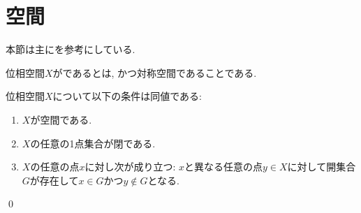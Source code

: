 \documentclass[uplatex, dvipdfmx, a4paper, 12pt, class=jsbook, crop=false]{standalone}
\begin{document}
\section{空間}
\label{sec:T1-spaces}

\begin{source}
	本節は主に\cite[Chapter 16]{Schechter1997HAF}を参考にしている.
\end{source}

\begin{definition}
	位相空間$ X $がであるとは, かつ対称空間であることである.
\end{definition}

\begin{proposition}
	位相空間$ X $について以下の条件は同値である:
	\begin{enumerate}
		\item $ X $が空間である.
		\item $ X $の任意の1点集合が閉である.
		\item $ X $の任意の点$ x $に対し次が成り立つ: $ x $と異なる任意の点$ y \in X $に対して開集合$ G $が存在して$ x \in G $かつ$ y \not\in G $となる.
	\end{enumerate}
	\qed
\end{proposition}
\end{document}
